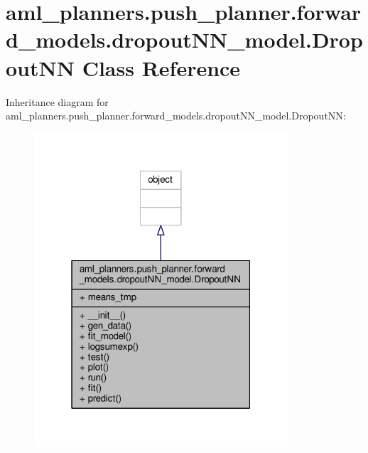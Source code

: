 \hypertarget{classaml__planners_1_1push__planner_1_1forward__models_1_1dropout_n_n__model_1_1_dropout_n_n}{\section{aml\-\_\-planners.\-push\-\_\-planner.\-forward\-\_\-models.\-dropout\-N\-N\-\_\-model.\-Dropout\-N\-N Class Reference}
\label{classaml__planners_1_1push__planner_1_1forward__models_1_1dropout_n_n__model_1_1_dropout_n_n}
}


Inheritance diagram for aml\-\_\-planners.\-push\-\_\-planner.\-forward\-\_\-models.\-dropout\-N\-N\-\_\-model.\-Dropout\-N\-N\-:\nopagebreak
\begin{figure}[H]
\begin{center}
\leavevmode
\includegraphics[width=268pt]{classaml__planners_1_1push__planner_1_1forward__models_1_1dropout_n_n__model_1_1_dropout_n_n__inherit__graph}
\end{center}
\end{figure}


